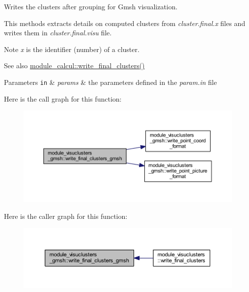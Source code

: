 Writes the clusters after grouping for Gmsh visualization. 

This methods extracts details on computed clusters from {\itshape cluster.\+final.\+x} files and writes them in {\itshape cluster.\+final.\+visu} file. \begin{DoxyNote}{Note}
{\itshape x} is the identifier (number) of a cluster. 
\end{DoxyNote}
\begin{DoxySeeAlso}{See also}
\hyperlink{namespacemodule__sortie_a819ceed76e9600e8eec63a7b730d1d92}{module\+\_\+calcul\+::write\+\_\+final\+\_\+clusters()} 
\end{DoxySeeAlso}

\begin{DoxyParams}[1]{Parameters}
\mbox{\tt in}  & {\em params} & the parameters defined in the \textit{param.in} file \\
\hline
\end{DoxyParams}


Here is the call graph for this function\+:\nopagebreak
\begin{figure}[H]
\begin{center}
\leavevmode
\includegraphics[width=350pt]{namespacemodule__visuclusters__gmsh_a3fe1790e0267b255e689ead80e6c8ca8_cgraph}
\end{center}
\end{figure}




Here is the caller graph for this function\+:\nopagebreak
\begin{figure}[H]
\begin{center}
\leavevmode
\includegraphics[width=350pt]{namespacemodule__visuclusters__gmsh_a3fe1790e0267b255e689ead80e6c8ca8_icgraph}
\end{center}
\end{figure}


